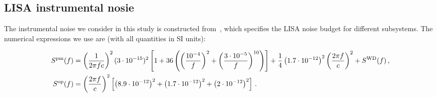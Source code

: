 \documentclass[aps,showpacs,twocolumn,prd,superscriptaddress,nofootinbib]{revtex4-1}
\newcommand{\bsub}{\begin{subequations}}
\newcommand{\esub}{\end{subequations}}
\newcommand{\Msol}{M_{\odot}}
\newcommand{\SM}[1]{{\color{Blue} [SM: #1]}}
\begin{document}

\subsection{LISA instrumental nosie}
\label{app:LISAnoise}

The instrumental noise we consider in this study is constructed from~\cite{LISANoiseBudget16}, which specifies the LISA noise budget for different subsystems. The numerical expressions we use are (with all quantities in SI units):
\begin{widetext}
\bsub
\begin{align}
	S^{\rm pm} (f) &= \left(\frac{1}{2\pi f c}\right)^{2} (3\cdot 10^{-15})^{2} \left[1 + 36 \left( \left(\frac{10^{-4}}{f}\right)^{2} + \left(\frac{3\cdot10^{-5}}{f}\right)^{10} \right)\right] + \frac{1}{4}\left(1.7\cdot 10^{-12}\right)^{2} \left(\frac{2\pi f}{c}\right)^{2} + S^{\rm WD}(f) \,,\\
	S^{\rm op} (f) &= \left(\frac{2\pi f}{c}\right)^{2} \left[\left(8.9\cdot 10^{-12}\right)^{2} + \left(1.7\cdot 10^{-12}\right)^{2} + \left(2\cdot 10^{-12}\right)^{2}\right] \,.
\end{align}
\esub
\end{widetext}


%


%
%
\end{document}
